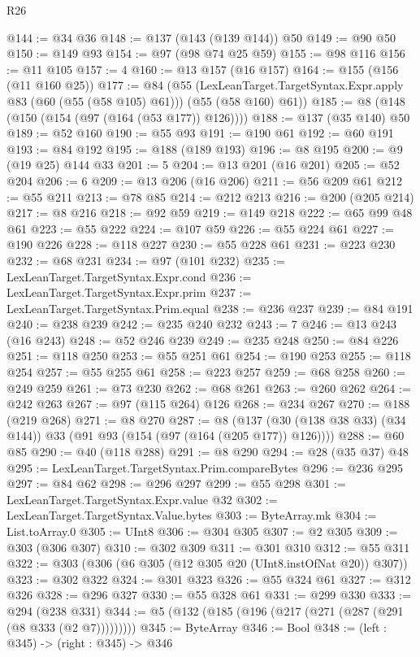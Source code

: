 \begin{lexlean}{R26}
\begin{coremodule}
@144 := @34 @36
@148 := @137 (@143 (@139 @144)) @50
@149 := @90 @50
@150 := @149 @93
@154 := @97 (@98 @74 @25 @59)
@155 := @98 @116
@156 := @11 @105
@157 := 4
@160 := @13 @157 (@16 @157)
@164 := @155 (@156 (@11 @160 @25))
@177 := @84
    (@55
      (LexLeanTarget.TargetSyntax.Expr.apply @83 (@60 (@55 (@58 @105) @61)))
      (@55 (@58 @160) @61))
@185 := @8 (@148 (@150 (@154 (@97 (@164 (@53 @177)) @126))))
@188 := @137 (@35 @140) @50
@189 := @52 @160
@190 := @55 @93
@191 := @190 @61
@192 := @60 @191
@193 := @84 @192
@195 := @188 (@189 @193)
@196 := @8 @195
@200 := @9 (@19 @25) @144 @33
@201 := 5
@204 := @13 @201 (@16 @201)
@205 := @52 @204
@206 := 6
@209 := @13 @206 (@16 @206)
@211 := @56 @209 @61
@212 := @55 @211
@213 := @78 @85
@214 := @212 @213
@216 := @200 (@205 @214)
@217 := @8 @216
@218 := @92 @59
@219 := @149 @218
@222 := @65 @99 @48 @61
@223 := @55 @222
@224 := @107 @59
@226 := @55 @224 @61
@227 := @190 @226
@228 := @118 @227
@230 := @55 @228 @61
@231 := @223 @230
@232 := @68 @231
@234 := @97 (@101 @232)
@235 := LexLeanTarget.TargetSyntax.Expr.cond
@236 := LexLeanTarget.TargetSyntax.Expr.prim
@237 := LexLeanTarget.TargetSyntax.Prim.equal
@238 := @236 @237
@239 := @84 @191
@240 := @238 @239
@242 := @235 @240 @232
@243 := 7
@246 := @13 @243 (@16 @243)
@248 := @52 @246 @239
@249 := @235 @248
@250 := @84 @226
@251 := @118 @250
@253 := @55 @251 @61
@254 := @190 @253
@255 := @118 @254
@257 := @55 @255 @61
@258 := @223 @257
@259 := @68 @258
@260 := @249 @259
@261 := @73 @230
@262 := @68 @261
@263 := @260 @262
@264 := @242 @263
@267 := @97 (@115 @264) @126
@268 := @234 @267
@270 := @188 (@219 @268)
@271 := @8 @270
@287 := @8 (@137 (@30 (@138 @38 @33) (@34 @144)) @33 (@91 @93 (@154 (@97 (@164 (@205 @177)) @126))))
@288 := @60 @85
@290 := @40 (@118 @288)
@291 := @8 @290
@294 := @28 (@35 @37) @48
@295 := LexLeanTarget.TargetSyntax.Prim.compareBytes
@296 := @236 @295
@297 := @84 @62
@298 := @296 @297
@299 := @55 @298
@301 := LexLeanTarget.TargetSyntax.Expr.value @32
@302 := LexLeanTarget.TargetSyntax.Value.bytes
@303 := ByteArray.mk
@304 := List.toArray.{0}
@305 := UInt8
@306 := @304 @305
@307 := @2 @305
@309 := @303 (@306 @307)
@310 := @302 @309
@311 := @301 @310
@312 := @55 @311
@322 := @303 (@306 (@6 @305 (@12 @305 @20 (UInt8.instOfNat @20)) @307))
@323 := @302 @322
@324 := @301 @323
@326 := @55 @324 @61
@327 := @312 @326
@328 := @296 @327
@330 := @55 @328 @61
@331 := @299 @330
@333 := @294 (@238 @331)
@344 := @5 (@132 (@185 (@196 (@217 (@271 (@287 (@291 (@8 @333 (@2 @7)))))))))
@345 := ByteArray
@346 := Bool
@348 := (left : @345) -> (right : @345) -> @346

\end{coremodule}
\end{lexlean}
